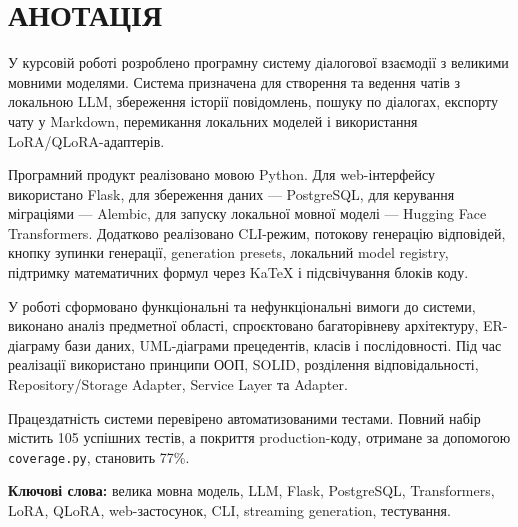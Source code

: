 \newpage
\section*{АНОТАЦІЯ}

У курсовій роботі розроблено програмну систему діалогової взаємодії з великими мовними моделями. Система призначена для створення та ведення чатів з локальною LLM, збереження історії повідомлень, пошуку по діалогах, експорту чату у Markdown, перемикання локальних моделей і використання LoRA/QLoRA-адаптерів.

Програмний продукт реалізовано мовою Python. Для web-інтерфейсу використано Flask, для збереження даних --- PostgreSQL, для керування міграціями --- Alembic, для запуску локальної мовної моделі --- Hugging Face Transformers. Додатково реалізовано CLI-режим, потокову генерацію відповідей, кнопку зупинки генерації, generation presets, локальний model registry, підтримку математичних формул через KaTeX і підсвічування блоків коду.

У роботі сформовано функціональні та нефункціональні вимоги до системи, виконано аналіз предметної області, спроєктовано багаторівневу архітектуру, ER-діаграму бази даних, UML-діаграми прецедентів, класів і послідовності. Під час реалізації використано принципи ООП, SOLID, розділення відповідальності, Repository/Storage Adapter, Service Layer та Adapter.

Працездатність системи перевірено автоматизованими тестами. Повний набір містить 105 успішних тестів, а покриття production-коду, отримане за допомогою \texttt{coverage.py}, становить 77\%.

\textbf{Ключові слова:} велика мовна модель, LLM, Flask, PostgreSQL, Transformers, LoRA, QLoRA, web-застосунок, CLI, streaming generation, тестування.

